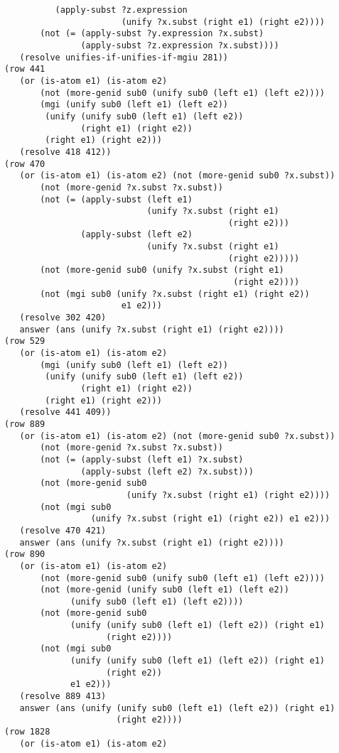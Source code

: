 \documentclass[runningheads]{llncs}
\begin{document}
\begin{verbatim}
          (apply-subst ?z.expression
                       (unify ?x.subst (right e1) (right e2))))
       (not (= (apply-subst ?y.expression ?x.subst)
               (apply-subst ?z.expression ?x.subst))))
   (resolve unifies-if-unifies-if-mgiu 281))
(row 441
   (or (is-atom e1) (is-atom e2)
       (not (more-genid sub0 (unify sub0 (left e1) (left e2))))
       (mgi (unify sub0 (left e1) (left e2))
        (unify (unify sub0 (left e1) (left e2))
               (right e1) (right e2))
        (right e1) (right e2)))
   (resolve 418 412))
(row 470
   (or (is-atom e1) (is-atom e2) (not (more-genid sub0 ?x.subst))
       (not (more-genid ?x.subst ?x.subst))
       (not (= (apply-subst (left e1)
                            (unify ?x.subst (right e1) 
                                            (right e2)))
               (apply-subst (left e2)
                            (unify ?x.subst (right e1) 
                                            (right e2)))))
       (not (more-genid sub0 (unify ?x.subst (right e1) 
                                             (right e2))))
       (not (mgi sub0 (unify ?x.subst (right e1) (right e2)) 
                       e1 e2)))
   (resolve 302 420)
   answer (ans (unify ?x.subst (right e1) (right e2))))
(row 529
   (or (is-atom e1) (is-atom e2)
       (mgi (unify sub0 (left e1) (left e2))
        (unify (unify sub0 (left e1) (left e2)) 
               (right e1) (right e2))
        (right e1) (right e2)))
   (resolve 441 409))
(row 889
   (or (is-atom e1) (is-atom e2) (not (more-genid sub0 ?x.subst))
       (not (more-genid ?x.subst ?x.subst))
       (not (= (apply-subst (left e1) ?x.subst)
               (apply-subst (left e2) ?x.subst)))
       (not (more-genid sub0 
                        (unify ?x.subst (right e1) (right e2))))
       (not (mgi sub0 
                 (unify ?x.subst (right e1) (right e2)) e1 e2)))
   (resolve 470 421)
   answer (ans (unify ?x.subst (right e1) (right e2))))
(row 890
   (or (is-atom e1) (is-atom e2)
       (not (more-genid sub0 (unify sub0 (left e1) (left e2))))
       (not (more-genid (unify sub0 (left e1) (left e2))
             (unify sub0 (left e1) (left e2))))
       (not (more-genid sub0
             (unify (unify sub0 (left e1) (left e2)) (right e1)
                    (right e2))))
       (not (mgi sub0
             (unify (unify sub0 (left e1) (left e2)) (right e1)
                    (right e2))
             e1 e2)))
   (resolve 889 413)
   answer (ans (unify (unify sub0 (left e1) (left e2)) (right e1)
                      (right e2))))
(row 1828
   (or (is-atom e1) (is-atom e2)

\end{verbatim}
\end{document}
